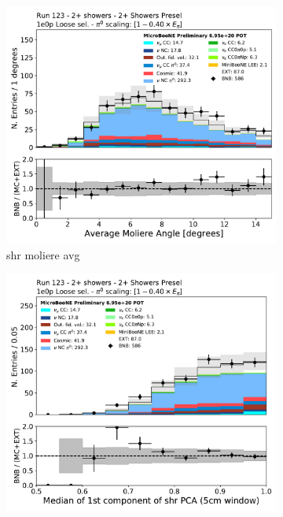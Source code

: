 \begin{figure}[H]
    \centering
    \begin{subfigure}{0.3\textwidth}
    \includegraphics[width=1.0\textwidth]{Sidebands/Figures/TwoShr_1e0pSel/loose/shrmoliereavg.pdf}
    \caption{shr moliere avg}
    \end{subfigure}
    \begin{subfigure}{0.3\textwidth}
    \includegraphics[width=1.0\textwidth]{Sidebands/Figures/TwoShr_1e0pSel/loose/shrPCA1CMed_5cm.pdf}

\end{subfigure}
\end{figure}
